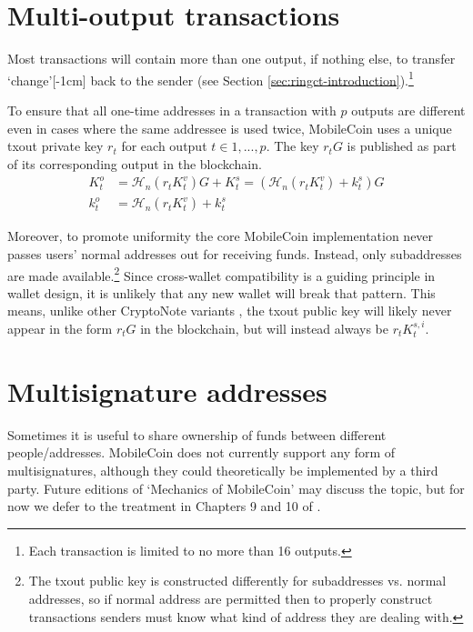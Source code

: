 \section{Multi-output transactions}
\label{sec:multi_out_transactions}

Most transactions will contain more than one output, if nothing else, to transfer `change’[-1cm] back to the sender (see Section \ref{sec:ringct-introduction}).\footnote{Each transaction is limited to no more than 16 outputs.}

To ensure that all one-time addresses in a transaction with $p$ outputs are different even in cases where the same addressee is used twice, MobileCoin uses a unique txout private key $r_t$ for each output $t \in 1, ..., p$. The key $r_t G$ is published as part of its corresponding output in the blockchain.\vspace{.175cm}
\begin{align*}
  K_t^o &= \mathcal{H}_n(r_t K_t^v)G + K_t^s = (\mathcal{H}_n(r_t K_t^v) + k_t^s)G  \\ 
  k_t^o &= \mathcal{H}_n(r_t K_t^v) + k_t^s
\end{align*} 

Moreover, to promote uniformity the core MobileCoin implementation never passes users' normal addresses out for receiving funds. Instead, only subaddresses are made available.\footnote{The txout public key is constructed differently for subaddresses vs. normal addresses, so if normal address are permitted then to properly construct transactions senders must know what kind of address they are dealing with.} Since cross-wallet compatibility is a guiding principle in wallet design, it is unlikely that any new wallet will break that pattern. This means, unlike other CryptoNote variants \cite{cryptoNoteWhitePaper}, the txout public key will likely never appear in the form $r_t G$ in the blockchain, but will instead always be $r_t K^{s,i}_t$.



\section{Multisignature addresses}
\label{sec:multisignature-addresses}

Sometimes it is useful to share ownership of funds between different people/addresses. MobileCoin does not currently support any form of multisignatures, although they could theoretically be implemented by a third party. Future editions of `Mechanics of MobileCoin' may discuss the topic, but for now we defer to the treatment in Chapters 9 and 10 of \cite{ztm-2}.